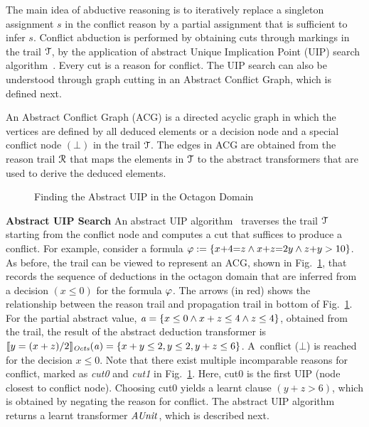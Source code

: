 The main idea of abductive  reasoning is to iteratively replace a singleton 
assignment $s$ in the conflict reason by a partial assignment that is sufficient 
to infer $s$.  Conflict abduction is performed by obtaining cuts through markings 
in the trail $\mathcal{T}$, by the application of abstract Unique Implication Point (UIP) 
search algorithm~\cite{cdcl}.  Every cut is a reason for conflict.  The UIP
search can also be understood through graph cutting in an Abstract Conflict
Graph, which is defined next. 
\begin{definition}
  An Abstract Conflict Graph (ACG) is a directed acyclic graph in which the 
  vertices are defined by all deduced elements or a decision node and a special 
  conflict node $(\bot)$ in the trail $\mathcal{T}$.  The edges in ACG are obtained 
  from the reason trail $\mathcal{R}$ that maps the elements in $\mathcal{T}$ to the abstract
  transformers that are used to derive the deduced elements.  
\end{definition}
%
\begin{figure}[t]
\centering
{}
\caption{\label{uip}Finding the Abstract UIP in the Octagon Domain}
\end{figure}  
%
\noindent \textbf{Abstract UIP Search}
An abstract UIP algorithm~\cite{DBLP:journals/fmsd/BrainDGHK14} traverses
the trail $\mathcal{T}$ starting from the conflict node and computes a cut that
suffices to produce a conflict.  For example, consider a formula $\varphi:=
\{x{+}4{=}z \wedge x{+}z{=}2y \wedge z{+}y>10\}$.  As before, the trail can be
viewed to represent an ACG, shown in Fig.~\ref{uip}, that records the 
sequence of deductions in the octagon domain that are inferred
from a decision $(x{\leq}0)$ for the formula $\varphi$.  The arrows (in
red) shows the relationship between the reason trail and propagation trail
in bottom of Fig.~\ref{uip}.  For the partial abstract value,
$\mathit{a}=\{x\leq0 \wedge x+z\leq4 \wedge z\leq4\}$, obtained from the trail,
the result of the abstract deduction transformer is
$\llbracket y=(x+z)/2 \rrbracket_{\mathit{Octs}}(\mathit{a})=\{x+y\leq2, y\leq2, y+z\leq6\}$. 
A~conflict ($\bot$) is reached for the decision ${x{\leq}0}$.  Note that
there exist multiple incomparable reasons for conflict, marked as {\em cut0}
and {\em cut1} in Fig.~\ref{uip}.  Here, cut0 is the first UIP (node closest
to conflict node).  Choosing cut0 yields a learnt clause $(y+z>6)$, which is
obtained by negating the reason for conflict.  The abstract UIP algorithm
returns a learnt transformer $\mathit{AUnit}$, which is described next.\\
%

